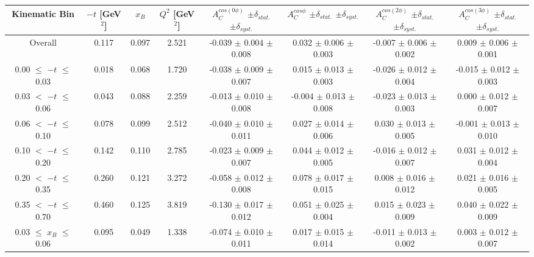 \begin{table}[width=15cm]
 \begin{center}
\resizebox{16cm}{!} {
  \begin{tabular}{|c|c|c|c|c|c|c|c|}
\hline
Kinematic Bin &  $-t$ [GeV$^{2}$] & $x_{B}$ & $Q^{2}$ [GeV$^{2}$] & 
$A^{cos (0\phi)}_{C}$ $\pm \delta_{stat.}$ $\pm \delta_{syst.}$ & $A^{cos \phi}_{C}$ $\pm \delta_{stat.}$ $\pm \delta_{syst.}$
& $A^{cos (2\phi)}_{C}$ $\pm \delta_{stat.}$ $\pm \delta_{syst.}$ & $A^{cos (3\phi)}_{C}$ $\pm \delta_{stat.}$ $\pm \delta_{syst.}$ \\
\hline
\hline
Overall &  0.117 & 0.097 &  2.521 &  -0.039 $\pm$  0.004 $\pm$  0.008 & 
0.032  $\pm$  0.006 $\pm$   0.003 &  -0.007  $\pm$  0.006  $\pm$   0.002 &  0.009  $\pm$   0.006   $\pm$   0.001 \\
\hline
0.00 $\leqslant$ $-t$ $\leqslant$ 0.03 &  0.018 & 0.068 &  1.720 &  -0.038  $\pm$  0.009 $\pm$ 0.007 & 
0.015  $\pm$  0.013  $\pm$   0.003 &  -0.026  $\pm$  0.012 $\pm$  0.004 &  -0.015   $\pm$  0.012   $\pm$   0.003\\
0.03 $<$ $-t$ $\leqslant$ 0.06 &  0.043 & 0.088 &  2.259& -0.013  $\pm$  0.010  $\pm$   0.008 &
 -0.004 $\pm$  0.013  $\pm$   0.008 &  -0.023  $\pm$  0.013  $\pm$  0.003 &  0.000   $\pm$  0.012   $\pm$   0.007\\
0.06 $<$ $-t$ $\leqslant$ 0.10 &  0.078 & 0.099 &  2.512 & -0.040  $\pm$  0.010  $\pm$  0.011 & 
0.027 $\pm$  0.014  $\pm$   0.006 & 0.030  $\pm$  0.013 $\pm$   0.005 &  -0.001   $\pm$  0.013  $\pm$    0.010\\
0.10 $<$ $-t$ $\leqslant$ 0.20 &  0.142 & 0.110 &  2.785 &  -0.023  $\pm$  0.009   $\pm$  0.007 & 
0.044 $\pm$  0.012  $\pm$   0.005 &  -0.016  $\pm$  0.012  $\pm$  0.007 & 0.031   $\pm$  0.012    $\pm$  0.004\\
0.20 $<$ $-t$ $\leqslant$ 0.35 &  0.260 & 0.121 &  3.272 &  -0.058 $\pm$   0.012  $\pm$  0.008 &
0.078 $\pm$  0.017  $\pm$ 0.015 & 0.008 $\pm$   0.016  $\pm$  0.012 & 0.021  $\pm$   0.016   $\pm$   0.005\\
0.35 $<$ $-t$ $\leqslant$ 0.70 &  0.460 & 0.125 &  3.819 &  -0.130  $\pm$  0.017  $\pm$   0.012 & 
0.051 $\pm$  0.025  $\pm$   0.004 & 0.015 $\pm$   0.023  $\pm$  0.009 & 0.040   $\pm$  0.022   $\pm$ 0.009\\
\hline
0.03 $\leqslant$ $x_{B}$ $\leqslant$ 0.06 &  0.095 & 0.049 &  1.338 &  -0.074  $\pm$  0.010  $\pm$   0.011 & 
 0.017  $\pm$  0.015  $\pm$   0.014 & -0.011 $\pm$  0.013 $\pm$   0.002 &  0.003   $\pm$  0.012  $\pm$    0.007\\

\end{tabular}}
\end{center}
\end{table}
